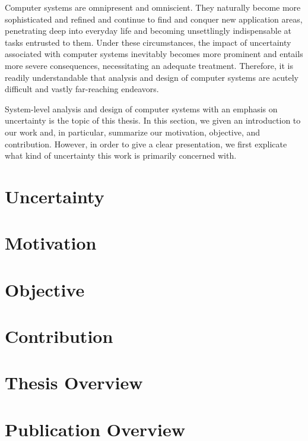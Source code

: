 Computer systems are omnipresent and omniscient. They naturally become more
sophisticated and refined and continue to find and conquer new application
areas, penetrating deep into everyday life and becoming unsettlingly
indispensable at tasks entrusted to them. Under these circumstances, the impact
of uncertainty associated with computer systems inevitably becomes more
prominent and entails more severe consequences, necessitating an adequate
treatment. Therefore, it is readily understandable that analysis and design of
computer systems are acutely difficult and vastly far-reaching endeavors.

System-level analysis and design of computer systems with an emphasis on
uncertainty is the topic of this thesis. In this section, we given an
introduction to our work and, in particular, summarize our motivation,
objective, and contribution. However, in order to give a clear presentation, we
first explicate what kind of uncertainty this work is primarily concerned with.

\section{Uncertainty}

\section{Motivation}

\section{Objective}

\section{Contribution}

\section{\priortitle}

\section{Thesis Overview}

\section{Publication Overview}
